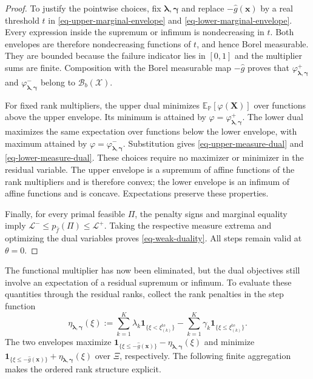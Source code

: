 \begin{proof}
  To justify the pointwise choices, fix $\bm\lambda,\bm\gamma$ and replace $-\hat g(\bm x)$ by a real threshold $t$ in \eqref{eq-upper-marginal-envelope} and \eqref{eq-lower-marginal-envelope}. Every expression inside the supremum or infimum is nondecreasing in $t$. Both envelopes are therefore nondecreasing functions of $t$, and hence Borel measurable. They are bounded because the failure indicator lies in $[0,1]$ and the multiplier sums are finite. Composition with the Borel measurable map $-\hat g$ proves that $\varphi^+_{\bm\lambda,\bm\gamma}$ and $\varphi^-_{\bm\lambda,\bm\gamma}$ belong to $\mathcal B_b(\mathcal X)$.

  For fixed rank multipliers, the upper dual minimizes $\mathbb E_{\mathbb P}[\varphi(\bm X)]$ over functions above the upper envelope. Its minimum is attained by $\varphi=\varphi^+_{\bm\lambda,\bm\gamma}$. The lower dual maximizes the same expectation over functions below the lower envelope, with maximum attained by $\varphi=\varphi^-_{\bm\lambda,\bm\gamma}$. Substitution gives \eqref{eq-upper-measure-dual} and \eqref{eq-lower-measure-dual}. These choices require no maximizer or minimizer in the residual variable. The upper envelope is a supremum of affine functions of the rank multipliers and is therefore convex; the lower envelope is an infimum of affine functions and is concave. Expectations preserve these properties.

  Finally, for every primal feasible $\Pi$, the penalty signs and marginal equality imply
  $\mathcal L^-\le p_{\hat f}(\Pi)\le\mathcal L^+$.
  Taking the respective measure extrema and optimizing the dual variables proves \eqref{eq-weak-duality}. All steps remain valid at $\theta=0$.
\end{proof}

The functional multiplier has now been eliminated, but the dual objectives still involve an expectation of a residual supremum or infimum. To evaluate these quantities through the residual ranks, collect the rank penalties in the step function
\begin{equation}
  \eta_{\bm\lambda,\bm\gamma}(\xi)
  :=\sum_{k=1}^K\lambda_k\mathbf1_{\{\xi<\xi_{(k)}^{\mathrm{te}}\}}
    -\sum_{k=1}^K\gamma_k\mathbf1_{\{\xi\le\xi_{(k)}^{\mathrm{te}}\}}.
  \label{eq-dual-step-function}
\end{equation}
The two envelopes maximize $\mathbf1_{\{\xi\le-\hat g(\bm x)\}}-\eta_{\bm\lambda,\bm\gamma}(\xi)$ and minimize $\mathbf1_{\{\xi\le-\hat g(\bm x)\}}+\eta_{\bm\lambda,\bm\gamma}(\xi)$ over $\Xi$, respectively. The following finite aggregation makes the ordered rank structure explicit.


